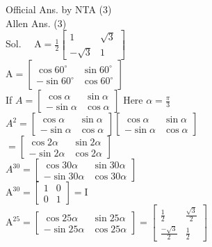 \documentclass[10pt]{article}
\begin{document}
Official Ans. by NTA (3)\\
Allen Ans. (3)\\
Sol. \(\quad \mathrm{A}=\frac{1}{2}\left[\begin{array}{cc}1 & \sqrt{3} \\ -\sqrt{3} & 1\end{array}\right]\)\\
\(\mathrm{A}=\left[\begin{array}{cc}\cos 60^{\circ} & \sin 60^{\circ} \\ -\sin 60^{\circ} & \cos 60^{\circ}\end{array}\right]\)\\
If \(A=\left[\begin{array}{cc}\cos \alpha & \sin \alpha \\ -\sin \alpha & \cos \alpha\end{array}\right]\) Here \(\alpha=\frac{\pi}{3}\)\\
\(A^{2}=\left[\begin{array}{cc}\cos \alpha & \sin \alpha \\ -\sin \alpha & \cos \alpha\end{array}\right]\left[\begin{array}{cc}\cos \alpha & \sin \alpha \\ -\sin \alpha & \cos \alpha\end{array}\right]\)\\
\(=\left[\begin{array}{cc}\cos 2 \alpha & \sin 2 \alpha \\ -\sin 2 \alpha & \cos 2 \alpha\end{array}\right]\)\\
\(A^{30}=\left[\begin{array}{cc}\cos 30 \alpha & \sin 30 \alpha \\ -\sin 30 \alpha & \cos 30 \alpha\end{array}\right]\)\\
\(\mathrm{A}^{30}=\left[\begin{array}{ll}1 & 0 \\ 0 & 1\end{array}\right]=\mathrm{I}\)\\
\(\mathrm{A}^{25}=\left[\begin{array}{cc}\cos 25 \alpha & \sin 25 \alpha \\ -\sin 25 \alpha & \cos 25 \alpha\end{array}\right]=\left[\begin{array}{cc}\frac{1}{2} & \frac{\sqrt{3}}{2} \\ \frac{-\sqrt{3}}{2} & \frac{1}{2}\end{array}\right]\)\\
\end{document}
